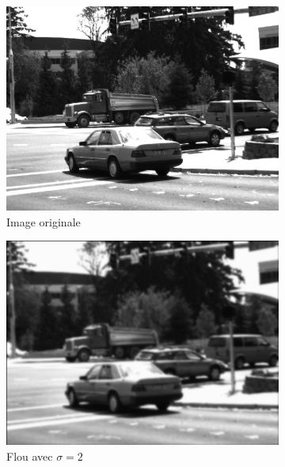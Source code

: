 \begin{enumerate}[questions, start=11]
\begin{figure}[!h]
  \begin{subfigure}{0.3\textwidth}
  \includegraphics[width=\textwidth]{img/dumptruck-noblur.png}
  \caption{Image originale}
  \end{subfigure}\hfill
  \begin{subfigure}{0.3\textwidth}
  \includegraphics[width=\textwidth]{img/dumptruck-blur-2.png}
  \caption{Flou avec $\sigma = 2$}
  \end{subfigure}\hfill
  \begin{subfigure}{0.3\textwidth}

\end{subfigure}
\end{figure}
\end{enumerate}
